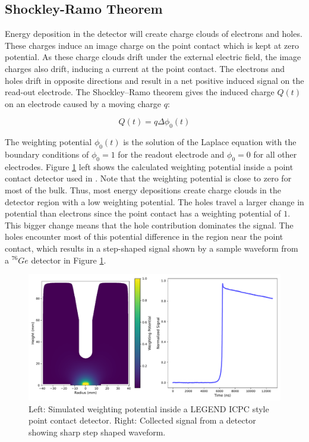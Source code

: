 \subsection{Shockley-Ramo Theorem}
Energy deposition in the detector will create charge clouds of electrons and holes. These charges induce an image charge on the point contact which is kept at zero potential. As these charge clouds drift under the external electric field, the image charges also drift, inducing a current at the point contact. The electrons and holes drift in opposite directions and result in a net positive induced signal on the read-out electrode. The Shockley–Ramo theorem gives the induced charge $Q(t)$ on an electrode caused by a moving charge $q$:

\begin{equation}\label{wp_eq}
Q(t)=q\Delta \phi_0(t)
\end{equation}

The weighting potential $\phi_0(t)$ is the solution of the Laplace equation with the boundary conditions of $\phi_0=1$ for the readout electrode and $\phi_0=0$ for all other electrodes. Figure \ref{fig:wp_signal} left shows the calculated weighting potential inside a point contact detector used in {\MJD}. Note that the weighting potential is close to zero for most of the bulk. Thus, most energy depositions create charge clouds in the detector region with a low weighting potential. The holes travel a larger change in potential than electrons since the point contact has a weighting potential of $1$. This bigger change means that the hole contribution dominates the signal. The holes encounter most of this potential difference in the region near the point contact, which results in a step-shaped signal shown by a sample waveform from a ${}^{76}Ge$ detector in Figure \ref{fig:wp_signal}.

  \begin{figure}[htb]
  \centering
  \includegraphics[trim=0 0.3cm 0 0,clip,width=\linewidth]{ch2/figs/wp_det.pdf}
  \caption{Left: Simulated weighting potential inside a LEGEND ICPC style point contact detector. Right: Collected signal from a detector showing sharp step shaped waveform.}
    \label{fig:wp_signal}
  \end{figure}

